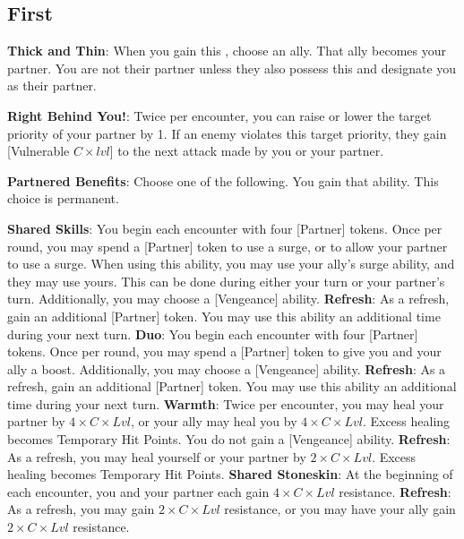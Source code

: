 \begin{multicols*}{2}
\subsection*{First \Facet\perk}
\textbf{Thick and Thin}: When you gain this \facet{}, choose an ally. That ally becomes your partner. You are not their partner unless they also possess this \facet and designate you as their partner.

\textbf{Right Behind You!}: Twice per encounter, you can raise or lower the target priority of your partner by 1. If an enemy violates this target priority, they gain [Vulnerable $C\times lvl$] to the next attack made by you or your partner.

\textbf{Partnered Benefits}: Choose one of the following. You gain that ability. This choice is permanent.
\begin{itemize}
\thing \textbf{Shared Skills}: You begin each encounter with four [Partner] tokens. Once per round, you may spend a [Partner] token to use a surge, or to allow your partner to use a surge. When using this ability, you may use your ally's surge ability, and they may use yours. This can be done during either your turn or your partner's turn. Additionally, you may choose a [Vengeance] ability. \textbf{Refresh}: As a refresh, gain an additional [Partner] token. You may use this ability an additional time during your next turn.
\thing \textbf{Duo}: You begin each encounter with four [Partner] tokens. Once per round, you may spend a [Partner] token to give you and your ally a boost.  Additionally, you may choose a [Vengeance] ability. \textbf{Refresh}: As a refresh, gain an additional [Partner] token. You may use this ability an additional time during your next turn.
\thing \textbf{Warmth}: Twice per encounter, you may heal your partner by $4\times C\times Lvl$, or your ally may heal you by $4\times C\times Lvl$. Excess healing becomes Temporary Hit Points. You do not gain a [Vengeance] ability. \textbf{Refresh}: As a refresh, you may heal yourself or your partner by $2\times C\times Lvl$. Excess healing becomes Temporary Hit Points.
\thing \textbf{Shared Stoneskin}: At the beginning of each encounter, you and your partner each gain $4\times C\times Lvl$ resistance. \textbf{Refresh}: As a refresh, you may gain $2\times C\times Lvl$ resistance, or you may have your ally gain $2\times C\times Lvl$ resistance.
\end{itemize}


\end{multicols*}
